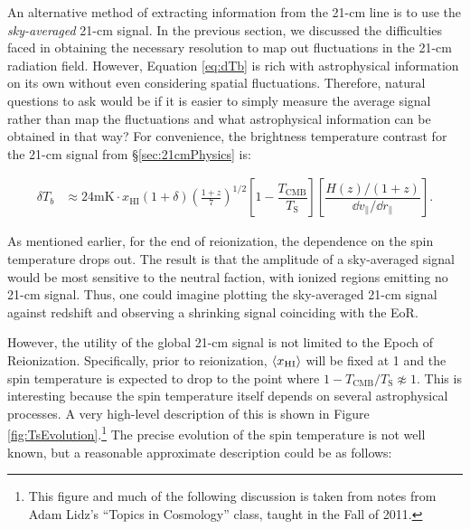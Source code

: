 An alternative method of extracting information from the 21-cm line is to use the \textit{sky-averaged} 21-cm signal. In the previous section, we discussed the difficulties faced in obtaining the necessary resolution to map out fluctuations in the 21-cm radiation field. However, Equation \ref{eq:dTb} is rich with astrophysical information on its own without even considering spatial fluctuations. Therefore, natural questions to ask would be if it is easier to simply measure the average signal rather than map the fluctuations and what astrophysical information can be obtained in that way? For convenience, the brightness temperature contrast for the 21-cm signal from \S \ref{sec:21cmPhysics} is:

\begin{align}
\delta T_{b} &\approx 24 \text{mK}\cdot x_{\text{HI}}(1+\delta)\left(\frac{1+z}{7}\right)^{1/2}\left[ 1 - \dfrac{T_{\text{CMB}}}{T_{\text{S}}} \right] \left[ \dfrac{H(z)/(1+z)}{\dd v_{\parallel}/ \dd r_{\parallel}} \right].
\end{align}

As mentioned earlier, for the end of reionization, the dependence on the spin temperature drops out. The result is that the amplitude of a sky-averaged signal  would be most sensitive to the neutral faction, with ionized regions emitting no 21-cm signal. Thus, one could imagine plotting the sky-averaged 21-cm signal against redshift and observing a shrinking signal coinciding with the EoR. 


However, the utility of the global 21-cm signal is not limited to the Epoch of Reionization. Specifically, prior to reionization, $\langle x_{\text{HI}}\rangle$ will be fixed at 1 and the spin temperature is expected to drop to the point where $1 - T_{\text{CMB}}/T_{\text{S}} \not\approx 1$. This is interesting because the spin temperature itself depends on several astrophysical processes. A very high-level description of this is shown in Figure \ref{fig:TsEvolution}.\footnote{This figure and much of the following discussion is taken from notes from Adam Lidz's ``Topics in Cosmology'' class, taught in the Fall of 2011.} The precise evolution of the spin temperature is not well known, but a reasonable approximate description could be as follows:

